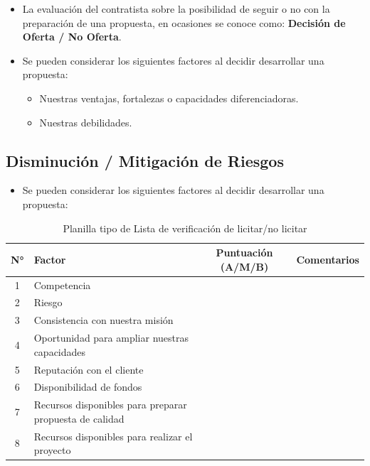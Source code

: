 \begin{itemize}
    \item La evaluación del contratista sobre la posibilidad de seguir o no con la preparación de una propuesta, en ocasiones se conoce como: \textbf{Decisión de Oferta / No Oferta}.
    \item Se pueden considerar los siguientes factores al decidir desarrollar una propuesta:
    \begin{itemize}
        \item Nuestras ventajas, fortalezas o capacidades diferenciadoras.
        \item Nuestras debilidades.
    \end{itemize}
\end{itemize}

\subsection*{Disminución / Mitigación de Riesgos}

\begin{itemize}
    \item Se pueden considerar los siguientes factores al decidir desarrollar una propuesta:
\end{itemize}

\begin{table}[h]
    \centering
    \small
    \begin{tabular}{|c|p{8cm}|c|p{4cm}|}
        \hline
        \textbf{N°} & \textbf{Factor} & \textbf{Puntuación (A/M/B)} & \textbf{Comentarios} \\
        \hline
        1 & Competencia & & \\
        \hline
        2 & Riesgo & & \\
        \hline
        3 & Consistencia con nuestra misión & & \\
        \hline
        4 & Oportunidad para ampliar nuestras capacidades & & \\
        \hline
        5 & Reputación con el cliente & & \\
        \hline
        6 & Disponibilidad de fondos & & \\
        \hline
        7 & Recursos disponibles para preparar propuesta de calidad & & \\
        \hline
        8 & Recursos disponibles para realizar el proyecto & & \\
        \hline
    \end{tabular}
    \caption{Planilla tipo de Lista de verificación de licitar/no licitar}
\end{table}

